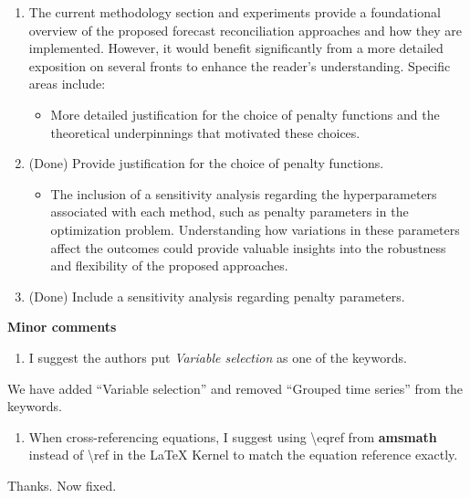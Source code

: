 \documentclass[11pt,a4paper,]{article}
\providecommand{\tightlist}{%
  \setlength{\itemsep}{0pt}\setlength{\parskip}{0pt}}
\renewenvironment{quote}
               {\list{}{\rightmargin\leftmargin}%
                \item\relax\color[RGB]{0,150,0}}
               {\endlist}
\begin{document}
\begin{enumerate}
\def\labelenumi{\arabic{enumi}.}
\setcounter{enumi}{5}
\item
  The current methodology section and experiments provide a foundational
  overview of the proposed forecast reconciliation approaches and how
  they are implemented. However, it would benefit significantly from a
  more detailed exposition on several fronts to enhance the reader's
  understanding. Specific areas include:

  \begin{itemize}
  \tightlist
  \item
    More detailed justification for the choice of penalty functions and
    the theoretical underpinnings that motivated these choices.
  \end{itemize}

  \begin{quote}
  (Done) Provide justification for the choice of penalty functions.
  \end{quote}

  \begin{itemize}
  \tightlist
  \item
    The inclusion of a sensitivity analysis regarding the
    hyperparameters associated with each method, such as penalty
    parameters in the optimization problem. Understanding how variations
    in these parameters affect the outcomes could provide valuable
    insights into the robustness and flexibility of the proposed
    approaches.
  \end{itemize}

  \begin{quote}
  (Done) Include a sensitivity analysis regarding penalty parameters.
  \end{quote}
\end{enumerate}

\textbf{Minor comments}

\begin{enumerate}
\def\labelenumi{\arabic{enumi}.}
\tightlist
\item
  I suggest the authors put \emph{Variable selection} as one of the
  keywords.
\end{enumerate}

\begin{quote}
We have added ``Variable selection'' and removed ``Grouped time series''
from the keywords.
\end{quote}

\begin{enumerate}
\def\labelenumi{\arabic{enumi}.}
\setcounter{enumi}{1}
\tightlist
\item
  When cross-referencing equations, I suggest using \textbackslash eqref
  from \textbf{amsmath} instead of \textbackslash ref in the LaTeX
  Kernel to match the equation reference exactly.
\end{enumerate}

\begin{quote}
Thanks. Now fixed.
\end{quote}

\printbibliography
\end{document}
